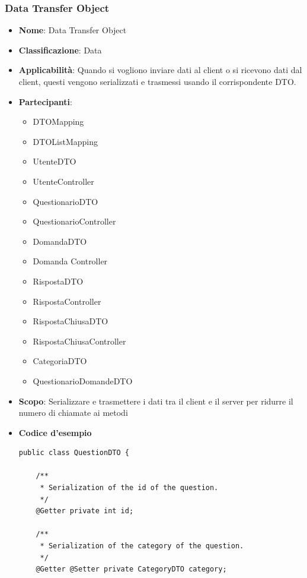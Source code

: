 \documentclass[12pt]{article}
\begin{document}
\subsubsection{Data Transfer Object}
		\begin{itemize}
		\item \textbf{Nome}: Data Transfer Object
            \item \textbf{Classificazione}: Data
            \item \textbf{Applicabilità}: Quando si vogliono inviare dati al client o si ricevono dati dal client, questi vengono serializzati e trasmessi usando il corrispondente DTO.
            \item \textbf{Partecipanti}:
                \begin{itemize}
                    \item DTOMapping
                    \item DTOListMapping
                    \item UtenteDTO
                    \item UtenteController
                    \item QuestionarioDTO
                    \item QuestionarioController
                    \item DomandaDTO
                    \item Domanda Controller
                    \item RispostaDTO
                    \item RispostaController
                    \item RispostaChiusaDTO
                    \item RispostaChiusaController
                    \item CategoriaDTO
                    \item QuestionarioDomandeDTO
                \end{itemize}
            \item \textbf{Scopo}: Serializzare e trasmettere i dati tra il client e il server per ridurre il numero di chiamate ai metodi
            \item \textbf{Codice d'esempio}
            \begin{lstlisting}
public class QuestionDTO {

	/**
	 * Serialization of the id of the question.
	 */
	@Getter	private int id;

	/**
	 * Serialization of the category of the question.
	 */
	@Getter	@Setter private CategoryDTO category;
	

\end{lstlisting}
\end{itemize}
\end{document}
